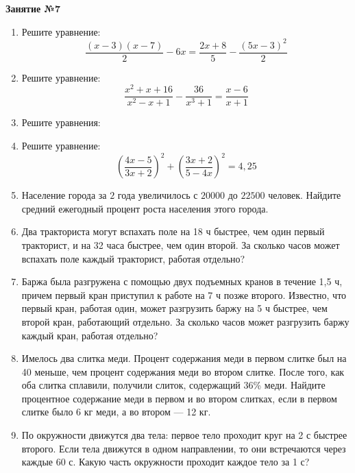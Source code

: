 \documentclass[12pt, a4paper]{article}
\begin{document}
	
	   \cfoot{}
	\begin{center}
		\Large
		\textbf{Занятие №7}
	\end{center}
	\begin{enumerate}[label=\textbf{\arabic*.}]
		\item Решите уравнение: $$\dfrac{(x-3)(x-7)}{2}-6x=\dfrac{2x+8}{5}-\dfrac{(5x-3)^2}{2}$$
		\item Решите уравнение: $$\dfrac{x^2+x+16}{x^2-x+1}-\dfrac{36}{x^3+1}=\dfrac{x-6}{x+1}$$
		\item Решите уравнения:
		\begin{enumerate}[label=\asbuk*)]
		\end{enumerate}
		\item Решите уравнение: $$\left( \dfrac{4x-5}{3x+2} \right)^2+\left( \dfrac{3x+2}{5-4x} \right)^2=4,25$$
		\item Население города за \( 2 \) года увеличилось с \( 20 000 \) до \( 22 500 \) человек. Найдите средний ежегодный процент роста населения этого города.
		\item Два тракториста могут вспахать поле на 18 ч быстрее, чем один первый тракторист, и на 32 часа быстрее, чем один второй. За сколько часов может вспахать поле каждый тракторист, работая отдельно?
		\item Баржа была разгружена с помощью двух подъемных кранов в течение 1,5 ч, причем первый кран приступил к работе на 7 ч позже второго. Известно, что первый кран, работая один, может разгрузить баржу на 5 ч быстрее, чем второй кран, работающий отдельно. За сколько часов может разгрузить баржу каждый кран, работая отдельно?
		\item Имелось два слитка меди. Процент содержания меди в первом слитке был на 40 меньше, чем процент содержания меди во втором слитке. После того, как оба слитка сплавили, получили слиток, содержащий 36\% меди. Найдите процентное содержание меди в первом и во втором слитках, если в первом слитке было 6 кг меди, а во втором --- 12 кг.
		\item По окружности движутся два тела: первое тело проходит круг на 2 с быстрее второго. Если тела движутся в одном направлении, то они встречаются через каждые 60 с. Какую часть окружности проходит каждое тело за 1 с?
	\end{enumerate}
\end{document}

